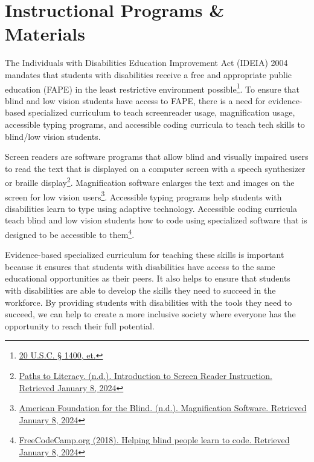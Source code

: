 \hypertarget{appx4}{}\chapter[\hfill\break\raggedright Instructional Programs \& Materials Materials]{Instructional Programs \& Materials}\label{appx4}
\noindent\makebox[\linewidth]{\rule{\linewidth}{0.4pt}}
{\let\clearpage\relax\localtableofcontents}\newpage

The Individuals with Disabilities Education Improvement Act (IDEIA) 2004 mandates that students with disabilities receive a free and appropriate public education (FAPE) in the least restrictive environment possible\footnote{\raggedright \href{http://sites.ed.gov/idea/statuteregulations/}{20 U.S.C. § 1400, et.}}. To ensure that blind and low vision students have access to FAPE, there is a need for evidence-based specialized curriculum to teach screenreader usage, magnification usage, accessible typing programs, and accessible coding curricula to teach tech skills to blind/low vision students.

Screen readers are software programs that allow blind and visually impaired users to read the text that is displayed on a computer screen with a speech synthesizer or braille display\footnote{\raggedright \href{https://www.pathstoliteracy.org/resource/introduction-screen-reader-instruction/}{Paths to Literacy. (n.d.). Introduction to Screen Reader Instruction. Retrieved January 8, 2024}}. Magnification software enlarges the text and images on the screen for low vision users\footnote{\raggedright \href{https://www.afb.org/blindness-and-low-vision/using-technology/assistive-technology-videos/magnification-software}{American Foundation for the Blind. (n.d.). Magnification Software. Retrieved January 8, 2024}}. Accessible typing programs help students with disabilities learn to type using adaptive technology. Accessible coding curricula teach blind and low vision students how to code using specialized software that is designed to be accessible to them\footnote{\raggedright \href{https://www.freecodecamp.org/news/helping-blind-people-learn-to-code-c47c68d4a237/}{FreeCodeCamp.org (2018). Helping blind people learn to code. Retrieved January 8, 2024}}.

Evidence-based specialized curriculum for teaching these skills is important because it ensures that students with disabilities have access to the same educational opportunities as their peers. It also helps to ensure that students with disabilities are able to develop the skills they need to succeed in the workforce. By providing students with disabilities with the tools they need to succeed, we can help to create a more inclusive society where everyone has the opportunity to reach their full potential.

